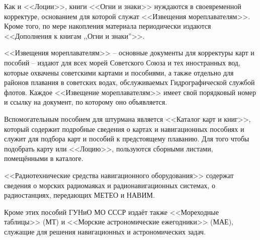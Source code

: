 Как и <<Лоции>>, книги <<Огни и знаки>> нуждаются в своевременной
корректуре, основанием для которой служат <<Извещения
мореплавателям>>. Кроме того, по мере накопления материала
периодически издаются <<Дополнения к книгам ,,Огни и знаки''>>.

<<Извещения мореплавателям>> \--- основные документы для корректуры
карт и пособий \--- издают для всех морей Советского Союза и тех
иностранных вод, которые охвачены советскими картами и пособиями, а
также отдельно для районов плавания в советских водах, обслуживаемых
Гидрографической службой флотов. Каждое <<Извещение мореплавателям>>
имеет свой порядковый номер и ссылку на документ, по которому оно
объявляется.

Вспомогательным пособием для штурмана является <<Каталог карт и
книг>>, который содержит подробные сведения о картах и навигационных
пособиях и служит для подбора карт и пособий к предстоящему
плаванию. Для того чтобы подобрать карту или <<Лоцию>>, пользуются
сборными листами, помещёнными в каталоге.

<<Радиотехнические средства навигационного оборудования>> содержат
сведения о морских радиомаяках и радионавигационных системах, о
радиостанциях, передающих МЕТЕО и НАВИМ.

Кроме этих пособий ГУНиО МО СССР издаёт также <<Мореходные таблицы>>
(МТ) и <<Морские астрономические ежегодники>> (МАЕ), служащие для
решения навигационных и астрономических задач.

